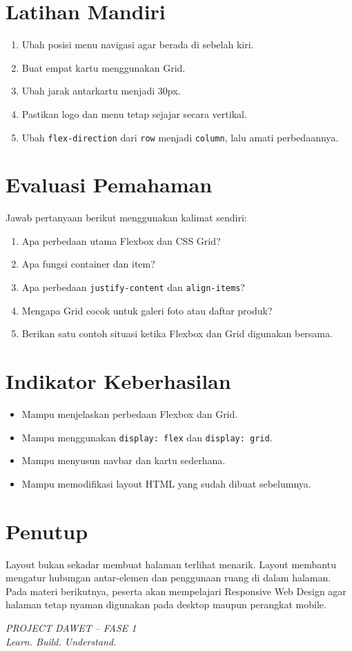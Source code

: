 \documentclass[11pt,a4paper]{article}
\begin{document}
\section{Latihan Mandiri}
\begin{enumerate}
\item Ubah posisi menu navigasi agar berada di sebelah kiri.
\item Buat empat kartu menggunakan Grid.
\item Ubah jarak antarkartu menjadi 30px.
\item Pastikan logo dan menu tetap sejajar secara vertikal.
\item Ubah \texttt{flex-direction} dari \texttt{row} menjadi \texttt{column}, lalu amati perbedaannya.
\end{enumerate}
\section{Evaluasi Pemahaman}
Jawab pertanyaan berikut menggunakan kalimat sendiri:
\begin{enumerate}
\item Apa perbedaan utama Flexbox dan CSS Grid?
\item Apa fungsi container dan item?
\item Apa perbedaan \texttt{justify-content} dan \texttt{align-items}?
\item Mengapa Grid cocok untuk galeri foto atau daftar produk?
\item Berikan satu contoh situasi ketika Flexbox dan Grid digunakan bersama.
\end{enumerate}
\section{Indikator Keberhasilan}
\begin{itemize}
\item Mampu menjelaskan perbedaan Flexbox dan Grid.
\item Mampu menggunakan \texttt{display: flex} dan \texttt{display: grid}.
\item Mampu menyusun navbar dan kartu sederhana.
\item Mampu memodifikasi layout HTML yang sudah dibuat sebelumnya.
\end{itemize}
\section*{Penutup}
Layout bukan sekadar membuat halaman terlihat menarik. Layout membantu mengatur hubungan antar-elemen dan penggunaan ruang di dalam halaman. Pada materi berikutnya, peserta akan mempelajari Responsive Web Design agar halaman tetap nyaman digunakan pada desktop maupun perangkat mobile.
\begin{center}\textit{PROJECT DAWET -- FASE 1\\Learn. Build. Understand.}\end{center}
\end{document}
